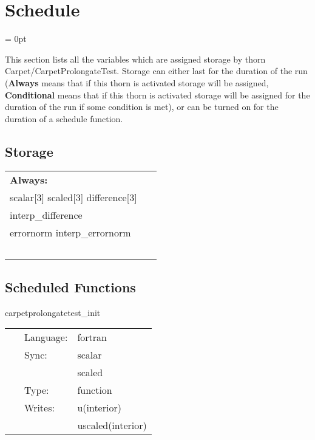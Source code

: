 
\section{Schedule} 


\parskip = 0pt


\noindent This section lists all the variables which are assigned storage by thorn Carpet/CarpetProlongateTest.  Storage can either last for the duration of the run ({\bf Always} means that if this thorn is activated storage will be assigned, {\bf Conditional} means that if this thorn is activated storage will be assigned for the duration of the run if some condition is met), or can be turned on for the duration of a schedule function.


\subsection*{Storage}

\hspace{5mm}

 \begin{tabular*}{160mm}{ll} 

{\bf Always:}&  ~ \\ 
 scalar[3] scaled[3] difference[3] & ~\\ 
 interp\_difference & ~\\ 
 errornorm interp\_errornorm & ~\\ 
~ & ~\\ 
\end{tabular*} 


\subsection*{Scheduled Functions}
\vspace{5mm}


\hspace{5mm} carpetprolongatetest\_init 

\hspace{5mm}{\it set up initial data } 


\hspace{5mm}

 \begin{tabular*}{160mm}{cll} 
~ & Language:  & fortran \\ 
~ & Sync:  & scalar \\ 
~& ~ &scaled\\ 
~ & Type:  & function \\ 
~ & Writes:  & u(interior) \\ 
~& ~ &uscaled(interior)\\ 
\end{tabular*} 


